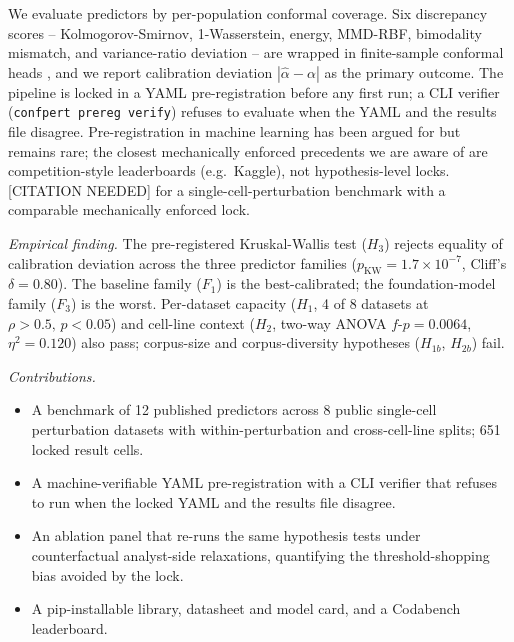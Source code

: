 \documentclass[11pt]{article}
\newcommand{\citeneeded}{{\color{orange}\textsf{[CITATION NEEDED]}}}
\begin{document}
We evaluate predictors by per-population conformal coverage. Six
discrepancy scores -- Kolmogorov-Smirnov, 1-Wasserstein, energy,
MMD-RBF, bimodality mismatch, and variance-ratio deviation -- are
wrapped in finite-sample conformal heads \cite{vovk2012,tibshirani2019,
romano2019,izbicki2022,cauchois2021,bates2021}, and we report
calibration deviation
$|{\hat{\alpha}} - \alpha|$ as the primary outcome. The pipeline is
locked in a YAML pre-registration before any first run; a CLI verifier
(\texttt{confpert prereg verify}) refuses to evaluate when the YAML and
the results file disagree. Pre-registration in machine learning has
been argued for \cite{hofman2023prereg,pineau2020reproducibility} but
remains rare; the closest mechanically enforced precedents we are aware
of are competition-style leaderboards (e.g.\ Kaggle), not
hypothesis-level locks. \citeneeded{} for a single-cell-perturbation
benchmark with a comparable mechanically enforced lock.

\noindent\emph{Empirical finding.}
The pre-registered Kruskal-Wallis test ($H_3$) rejects equality of
calibration deviation across the three predictor families
($p_\text{KW} = 1.7 \times 10^{-7}$, Cliff's $\delta = 0.80$). The
baseline family ($F_1$) is the best-calibrated; the
foundation-model family ($F_3$) is the worst. Per-dataset capacity
($H_1$, 4 of 8 datasets at $\rho > 0.5,\, p < 0.05$) and cell-line
context ($H_2$, two-way ANOVA $f$-$p = 0.0064$, $\eta^2 = 0.120$) also
pass; corpus-size and corpus-diversity hypotheses ($H_{1b}$, $H_{2b}$)
fail.

\noindent\emph{Contributions.}
\begin{itemize}
  \item A benchmark of 12 published predictors across 8 public
        single-cell perturbation datasets with within-perturbation and
        cross-cell-line splits; 651 locked result cells.
  \item A machine-verifiable YAML pre-registration with a CLI verifier
        that refuses to run when the locked YAML and the results file
        disagree.
  \item An ablation panel that re-runs the same hypothesis tests under
        counterfactual analyst-side relaxations, quantifying the
        threshold-shopping bias avoided by the lock.
  \item A pip-installable library, datasheet and model card, and a
        Codabench leaderboard.
\end{itemize}

\end{document}
